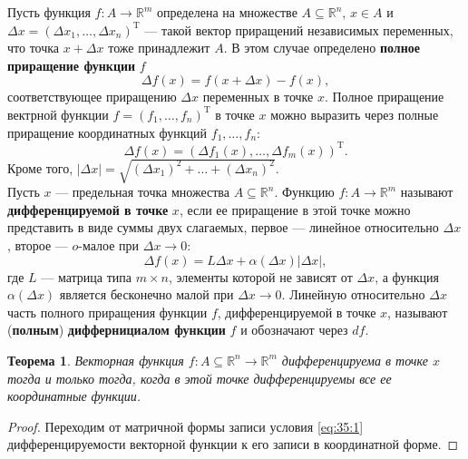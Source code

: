 \documentclass[12pt]{report}
\numberwithin{equation}{section}
\newtheorem{theorem}{Теорема}[section]
\begin{document}
Пусть функция $f : A \to \mathbb{R}^m$ определена  на множестве $A \subseteq \mathbb{R}^n$, $x \in A$ и $\Delta x = (\Delta x_1, \ldots, \Delta x_n)^{\mathrm{T}}$ --- такой вектор приращений независимых переменных, что точка $x + \Delta x$ тоже принадлежит $A$. В этом случае определено \textbf{полное приращение функции} $f$
\[ \Delta f(x) = f(x + \Delta x) - f(x),\]
соответствующее приращению $\Delta x$ переменных в точке $x$. Полное приращение вектрной функции $f = (f_1, \ldots, f_n)^{\mathrm{T}}$ в точке $x$ можно выразить через полные приращение координатных функций $f_1, \ldots, f_n$:
\begin{equation} \label{eq:35:1} \Delta f(x) = (\Delta f_1(x), \ldots, \Delta f_m(x))^{\mathrm{T}}. \end{equation}
Кроме того, $|\Delta x| = \sqrt{(\Delta x_1)^2 + \dots + (\Delta x_n)^2}$.\\

Пусть $x$ --- предельная точка множества $A \subseteq \mathbb{R}^n$. Функцию $f: A \to \mathbb{R}^m$ называют \textbf{дифференцируемой в точке} $x$, если ее приращение в этой точке можно представить в виде суммы двух слагаемых, первое --- линейное относительно $\Delta x$, второе --- $o$-малое при $\Delta x \to 0$:
\begin{equation} \label{eq:35:1}
\Delta f(x) = L \Delta x + \alpha(\Delta x)|\Delta x|,
\end{equation}
где $L$ --- матрица типа $m \times n$, элементы которой не зависят от $\Delta x$, а функция $\alpha(\Delta x)$ является бесконечно малой при $\Delta x \to 0$. Линейную относительно $\Delta x$ часть полного приращения функции $f$, дифференцируемой в точке $x$, называют (\textbf{полным}) \textbf{диффернициалом функции} $f$ и обозначают через $df$.

\begin{theorem} \label{th:35:1}
Векторная функция $f : A \subseteq \mathbb{R}^n \to \mathbb{R}^m$ дифференцируема в точке $x$ тогда и только тогда, когда в этой точке дифференцируемы все ее координатные функции.
\end{theorem}
\begin{proof}
Переходим от матричной формы записи условия \eqref{eq:35:1} дифференцируемости векторной функции к его записи в координатной форме.
\end{proof}
\end{document}
